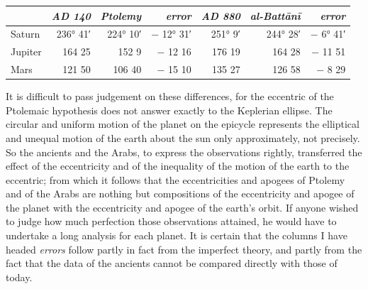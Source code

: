 \documentclass[11pt]{article}
\newcommand{\Pg}[1]{\marginpar{\footnotesize\color{gray}#1}}
\begin{document}
\begin{center}\small\begin{tabular}{lrrr|rrr}
 & \emph{AD 140} & \emph{Ptolemy\footnotemarkT{}} & \emph{error} & \emph{AD 880} & \emph{al-Battānī} & \emph{error} \\
\midrule
Saturn & 236° 41′ & 224° 10′ & − 12° 31′ & 251° 9′ & 244° 28′ & − 6° 41′ \\
Jupiter & 164 25 & 152 9 & − 12 16 & 176 19 & 164 28 & − 11 51 \\
Mars & 121 50 & 106 40 & − 15 10 & 135 27 & 126 58 & − 8 29 \\
\end{tabular}\end{center}
\addtocounter{footnoteT}{-1}
\par \Pg{I 242}It is difficult to pass judgement on these differences, for the eccentric of the Ptolemaic hypothesis does not answer exactly to the Keplerian ellipse. The circular and uniform motion of the planet on the epicycle represents the elliptical and unequal motion of the earth about the sun only approximately, not precisely. So the ancients and the Arabs, to express the observations rightly, transferred the effect of the eccentricity and of the inequality of the motion of the earth to the eccentric; from which it follows that the eccentricities and apogees of Ptolemy and of the Arabs are nothing but compositions of the eccentricity and apogee of the planet with the eccentricity and apogee of the earth's orbit. If anyone wished to judge how much perfection those observations attained, he would have to undertake a long analysis for each planet. It is certain that the columns I have headed \emph{errors} follow partly in fact from the imperfect theory, and partly from the fact that the data of the ancients cannot be compared directly with those of today.\par
\end{document}
